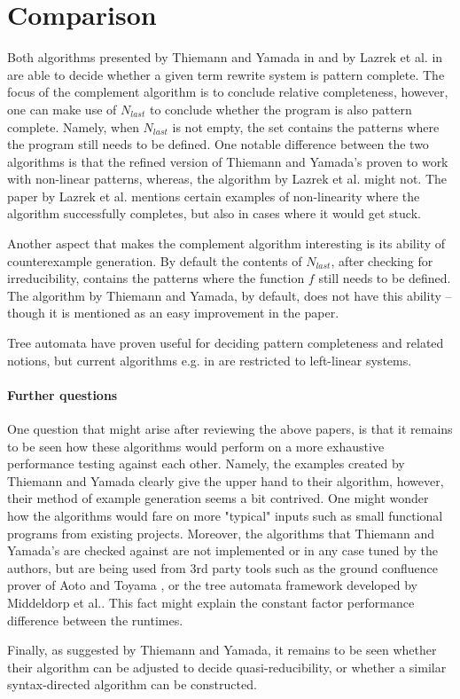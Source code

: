 \section{Comparison} \label{discussion}
Both algorithms presented by Thiemann and Yamada in \cite{thiemann} and by Lazrek et al. in \cite{lazrek} are able to decide whether a given term rewrite system is pattern complete. The focus of the complement algorithm is to conclude relative completeness, however, one can make use of $N_{last}$ to conclude whether the program is also pattern complete. Namely, when $N_{last}$ is not empty, the set contains the patterns where the program still needs to be defined. One notable difference between the two algorithms is that the refined version of Thiemann and Yamada's proven to work with non-linear patterns, whereas, the algorithm by Lazrek et al. might not. The paper by Lazrek et al. mentions certain examples of non-linearity where the algorithm successfully completes, but also in cases where it would get stuck.

Another aspect that makes the complement algorithm interesting is its ability of counterexample generation. By default the contents of $N_{last}$, after checking for irreducibility, contains the patterns where the function $f$ still needs to be defined\cite{lazrek}. The algorithm by Thiemann and Yamada, by default, does not have this ability – though it is mentioned as an easy improvement in the paper\cite{thiemann}.

Tree automata have proven useful for deciding pattern completeness and related notions, but current algorithms e.g. in \cite{middeldorp} are restricted to left-linear systems.

\paragraph{Further questions}
One question that might arise after reviewing the above papers, is that it remains to be seen how these algorithms would perform on a more exhaustive performance testing against each other. Namely, the examples created by Thiemann and Yamada clearly give the upper hand to their algorithm\cite{thiemann}, however, their method of example generation seems a bit contrived. One might wonder how the algorithms would fare on more "typical" inputs such as small functional programs from existing projects. Moreover, the algorithms that Thiemann and Yamada's are checked against are not implemented or in any case tuned by the authors, but are being used from 3rd party tools such as the ground confluence prover of Aoto and Toyama \cite{aoto}, or the tree automata framework developed by Middeldorp et al.\cite{middeldorp}. This fact might explain the constant factor performance difference between the runtimes.

Finally, as suggested by Thiemann and Yamada, it remains to be seen whether their algorithm can be adjusted to decide quasi-reducibility, or whether a similar syntax-directed algorithm can be constructed.